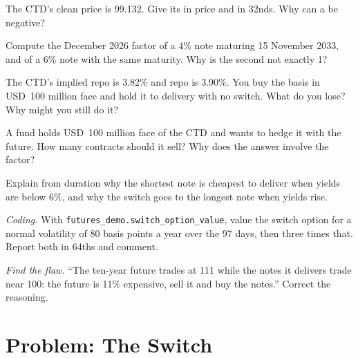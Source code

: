 \begin{exercise}[$\star$]\label{exo:m2:bond-futures:2}
The CTD's clean price is 99.132. Give its  in price and in 32nds.
Why can a  be negative?
\end{exercise}

\begin{exercise}[$\star$]\label{exo:m2:bond-futures:3}
Compute the December 2026 factor of a 4\% note maturing 15 November 2033, and
of a 6\% note with the same maturity. Why is the second not exactly 1?
\end{exercise}

\begin{exercise}[$\star\star$]\label{exo:m2:bond-futures:4}
The CTD's implied repo is 3.82\% and repo is 3.90\%. You buy the basis in
USD~100 million face and hold it to delivery with no switch. What do you lose?
Why might you still do it?
\end{exercise}

\begin{exercise}[$\star\star$]\label{exo:m2:bond-futures:5}
A fund holds USD~100 million face of the CTD and wants to hedge it with the
future. How many contracts should it sell? Why does the answer involve the
factor?
\end{exercise}

\begin{exercise}[$\star\star$]\label{exo:m2:bond-futures:6}
Explain from duration why the shortest note is cheapest to deliver when
yields are below 6\%, and why the switch goes to the longest note when yields
rise.
\end{exercise}

\begin{exercise}[$\star\star\star$]\label{exo:m2:bond-futures:7}
\emph{Coding.} With \texttt{futures\_demo.switch\_option\_value}, value the
switch option for a normal volatility of 80 basis points a year over the 97
days, then three times that. Report both in 64ths and comment.
\end{exercise}

\begin{exercise}[$\star\star\star$]\label{exo:m2:bond-futures:8}
\emph{Find the flaw.} ``The ten-year future trades at 111 while the notes it
delivers trade near 100: the future is 11\% expensive, sell it and buy the
notes.'' Correct the reasoning.
\end{exercise}

\section{Problem: The Switch}

